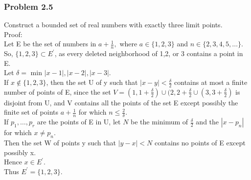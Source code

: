 \subsubsection{Problem 2.5}
Construct a bounded set of real numbers with exactly three limit points. \\
Proof:\\ 
Let E be the set of numbers in $a+ \frac{1}{n},$ where $a \in \{1,2,3\}$ and $n \in \{2,3,4,5, \dots\}.$\\
So, $\{1,2,3\} \subset E^'$, as every deleted neighborhood of 1,2, or 3 contains a point in E.\\
 Let $\delta =$ min ${|x-1|,|x-2|,|x-3|}.$\\
 If $x \notin \{1,2,3\}$, then the set U of y such that $|x-y|< \frac{\delta}{2}$ contains at most a finite number of points of E, since the set $V=(1,1+\frac{\delta}{2}) \cup (2,2+\frac{\delta}{2} \cup (3,3+\frac{\delta}{2})$ is disjoint from U, and V contains all the points of the set E except possibly the finite set of points $a + \frac{1}{n}$ for which $n \leq \frac{2}{\delta}.$ \\
 If $p_1, \dots, p_r$ are the points of E in U, let $N$ be the minimum of $\frac{\delta}{2}$ and the $|x-p_n|$ for which $x \neq p_n.$ \\
 Then the set W of points y such that $|y-x|< N$ contains no points of E except possibly x. \\
 Hence $x \in E^'.$ \\
 Thus $E^{'}=\{1,2,3\}.$


